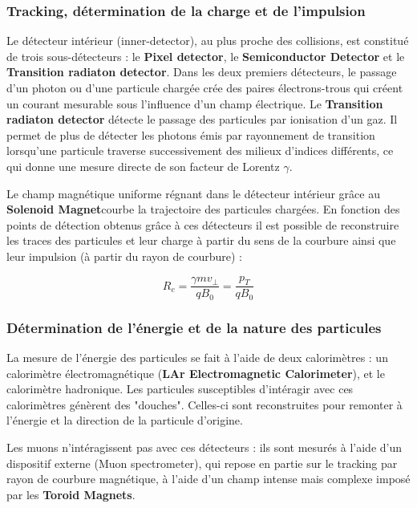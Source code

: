 \documentclass[11pt]{article} %
\begin{document}
\subsubsection{Tracking, détermination de la charge et de l'impulsion}

Le détecteur intérieur (inner-detector), au plus proche des collisions, est constitué de trois sous-détecteurs : le \textbf{Pixel detector}, le \textbf{Semiconductor Detector} et le \textbf{Transition radiaton detector}. Dans les deux premiers détecteurs, le passage d'un photon ou d'une particule chargée crée des paires électrons-trous qui créent un courant mesurable sous l'influence d'un champ électrique. 
Le \textbf{Transition radiaton detector} détecte le passage des particules par ionisation d'un gaz. Il permet de plus de détecter les photons émis par rayonnement de transition lorsqu'une particule traverse successivement des milieux d'indices différents, ce qui donne une mesure directe de son facteur de Lorentz $\gamma$.

Le champ magnétique uniforme régnant dans le détecteur  intérieur  grâce au \textbf{Solenoid Magnet}courbe la trajectoire des particules chargées. En fonction des points de détection obtenus grâce à ces détecteurs il est possible de reconstruire les traces des particules et leur charge à partir du sens de la courbure ainsi que leur impulsion (à partir du rayon de courbure) :

\begin{equation} 
R_c = \dfrac{\gamma mv_{\perp}}{qB_0} = \dfrac{p_{T}}{qB_0}
\end{equation}

\subsubsection{Détermination de l'énergie et de la nature des particules}

La mesure de l'énergie des particules se fait à l'aide de deux calorimètres : un calorimètre électromagnétique (\textbf{LAr Electromagnetic Calorimeter}), et le calorimètre hadronique. Les particules susceptibles d'intéragir avec ces calorimètres génèrent des "douches". Celles-ci sont reconstruites pour remonter à l'énergie et la direction de la particule d'origine.

Les muons n'intéragissent pas avec ces détecteurs : ils sont mesurés à l'aide d'un dispositif externe (Muon spectrometer), qui repose en partie sur le tracking par rayon de courbure magnétique, à l'aide d'un champ intense mais complexe imposé par les \textbf{Toroid Magnets}.
\end{document}
